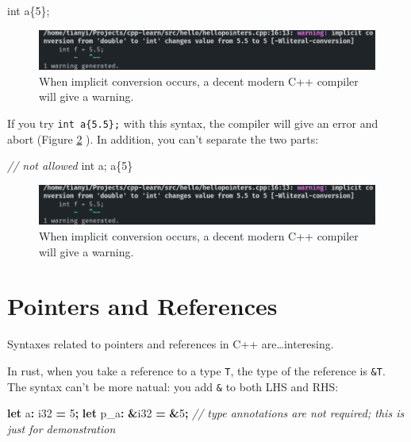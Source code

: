 \documentclass[
]{book}
\newenvironment{Shaded}{\begin{snugshade}}{\end{snugshade}}
\newcommand{\CommentTok}[1]{\textcolor[rgb]{0.56,0.35,0.01}{\textit{#1}}}
\newcommand{\DataTypeTok}[1]{\textcolor[rgb]{0.13,0.29,0.53}{#1}}
\newcommand{\DecValTok}[1]{\textcolor[rgb]{0.00,0.00,0.81}{#1}}
\newcommand{\KeywordTok}[1]{\textcolor[rgb]{0.13,0.29,0.53}{\textbf{#1}}}
\newcommand{\NormalTok}[1]{#1}
\newcommand{\OperatorTok}[1]{\textcolor[rgb]{0.81,0.36,0.00}{\textbf{#1}}}
\begin{document}
\begin{Shaded}
\begin{Highlighting}[]
\DataTypeTok{int}\NormalTok{ a\{}\DecValTok{5}\NormalTok{\};}
\end{Highlighting}
\end{Shaded}

\begin{figure}
\centering
\includegraphics{img/equal.png}
\caption{\label{fig:equal}When implicit conversion occurs, a decent modern C++ compiler will give a warning.}
\end{figure}

If you try \texttt{int\ a\{5.5\};} with this syntax, the compiler will give an error and abort (Figure \ref{fig:braces} ). In addition, you can't separate the two parts:

\begin{Shaded}
\begin{Highlighting}[]
\CommentTok{// not allowed}
\DataTypeTok{int}\NormalTok{ a;}
\NormalTok{a\{}\DecValTok{5}\NormalTok{\}}
\end{Highlighting}
\end{Shaded}

\begin{figure}
\centering
\includegraphics{img/equal.png}
\caption{\label{fig:braces}When implicit conversion occurs, a decent modern C++ compiler will give a warning.}
\end{figure}

\hypertarget{pointers-and-references}{%
\section{Pointers and References}\label{pointers-and-references}}

Syntaxes related to pointers and references in C++ are\ldots interesing.

In rust, when you take a reference to a type \texttt{T}, the type of the reference is \texttt{\&T}. The syntax can't be more natual: you add \texttt{\&} to both LHS and RHS:

\begin{Shaded}
\begin{Highlighting}[]
\KeywordTok{let}\NormalTok{   a}\OperatorTok{:}  \DataTypeTok{i32} \OperatorTok{=}  \DecValTok{5}\OperatorTok{;}
\KeywordTok{let}\NormalTok{ p\_a}\OperatorTok{:} \OperatorTok{\&}\DataTypeTok{i32} \OperatorTok{=} \OperatorTok{\&}\DecValTok{5}\OperatorTok{;} \CommentTok{// type annotations are not required; this is just for demonstration}
\end{Highlighting}
\end{Shaded}
\end{document}
